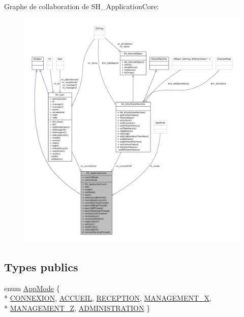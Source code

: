 Graphe de collaboration de S\-H\-\_\-\-Application\-Core\-:\nopagebreak
\begin{figure}[H]
\begin{center}
\leavevmode
\includegraphics[width=350pt]{classSH__ApplicationCore__coll__graph}
\end{center}
\end{figure}
\subsection*{Types publics}
\begin{DoxyCompactItemize}
\item 
enum \hyperlink{classSH__ApplicationCore_a6b93b2f83a290305f282616eb2935899}{App\-Mode} \{ \\*
\hyperlink{classSH__ApplicationCore_a6b93b2f83a290305f282616eb2935899a3594de687d70f634e91ef60a63b74172}{C\-O\-N\-N\-E\-X\-I\-O\-N}, 
\hyperlink{classSH__ApplicationCore_a6b93b2f83a290305f282616eb2935899a1892b908076a0887805e80f590ecdef4}{A\-C\-C\-U\-E\-I\-L}, 
\hyperlink{classSH__ApplicationCore_a6b93b2f83a290305f282616eb2935899a16687d65e8feb3b768ff655d73a45916}{R\-E\-C\-E\-P\-T\-I\-O\-N}, 
\hyperlink{classSH__ApplicationCore_a6b93b2f83a290305f282616eb2935899ae3d0d6045024cbde467f9c8cb536c6a8}{M\-A\-N\-A\-G\-E\-M\-E\-N\-T\-\_\-\-X}, 
\\*
\hyperlink{classSH__ApplicationCore_a6b93b2f83a290305f282616eb2935899ad68aea91f508ecc6cc9fe1430ddccaf1}{M\-A\-N\-A\-G\-E\-M\-E\-N\-T\-\_\-\-Z}, 
\hyperlink{classSH__ApplicationCore_a6b93b2f83a290305f282616eb2935899a110d50af3f0d2f505021620359b6163b}{A\-D\-M\-I\-N\-I\-S\-T\-R\-A\-T\-I\-O\-N}
 \}
\end{DoxyCompactItemize}

